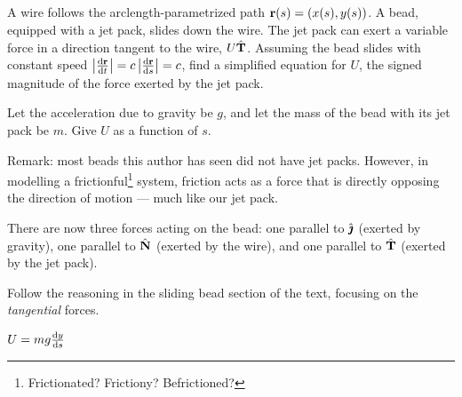 \subsection*{\Application}

\begin{question}\label{s1.7:friction}
A wire follows the arclength-parametrized path $\mathbf{r}(s)=(x(s),y(s))$.
A bead, equipped with a jet pack, slides down the wire. The jet pack can exert a variable force in a direction tangent to the wire, $U\hat{\mathbf{T}}$. Assuming the bead slides with constant speed $\left|\diff{\vr}{t}\right|=c\left| \diff{\vr}{s}\right|=c$, find a simplified equation for $U$, the signed magnitude of the force exerted by the jet pack.


Let the acceleration due to gravity be $g$, and let the mass of the bead with its jet pack be $m$. Give $U$ as a function of $s$.

Remark: most beads this author has seen did not have jet packs. However, in modelling a frictionful\footnote{Frictionated? Frictiony? Befrictioned?} system, friction acts as a force that is directly opposing the direction of motion --- much like our jet pack.
\end{question}
\begin{hint}
There are now three forces acting on the bead: one parallel to $\hat{\pmb{\jmath}}$ (exerted by gravity), one parallel to $\hat{\mathbf{N}}$ (exerted by the wire), and one parallel to $\hat{\mathbf{T}}$  (exerted by the jet pack).

Follow the reasoning in the sliding bead section of the text, focusing on the \emph{tangential} forces.
\end{hint}
\begin{answer}
$U={mg\diff{y}{s}}$
\end{answer}
